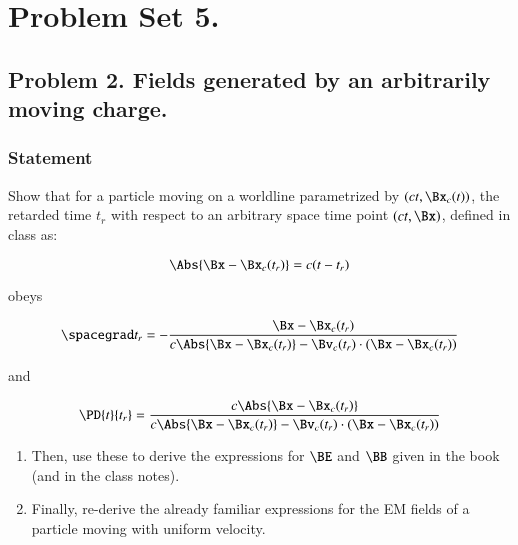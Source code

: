 %
%

\chapter{Problem Set 5.}
\label{chap:relElectroDynProblemSet5}
\date{Mar 14, 2011}

\beginArtWithToc



\section{Problem 2.  Fields generated by an arbitrarily moving charge.}

\subsection{Statement}

Show that for a particle moving on a worldline parametrized by $(ct, \Bx_c(t))$, the retarded time $t_r$ with respect to an arbitrary space time point $(ct, \Bx)$, defined in class as:

\begin{equation}\label{eqn:relElectroDynProblemSet5:10}
\Abs{\Bx - \Bx_c(t_r)} = c(t - t_r)
\end{equation}

obeys 

\begin{equation}\label{eqn:relElectroDynProblemSet5:30}
\spacegrad t_r = -\frac{\Bx - \Bx_c(t_r)}{
c \Abs{\Bx - \Bx_c(t_r)} - \Bv_c(t_r) \cdot (\Bx - \Bx_c(t_r))
}
\end{equation}

and

\begin{equation}\label{eqn:relElectroDynProblemSet5:50}
\PD{t}{t_r} = \frac{c \Abs{\Bx - \Bx_c(t_r)}}{
c \Abs{\Bx - \Bx_c(t_r)} - \Bv_c(t_r) \cdot (\Bx - \Bx_c(t_r))
}
\end{equation}

\begin{enumerate}
\item Then, use these to derive the expressions for $\BE$ and $\BB$ given in the book (and in the class notes).
\item Finally, re-derive the already familiar expressions for the EM fields of a particle moving with uniform velocity.
\end{enumerate}

